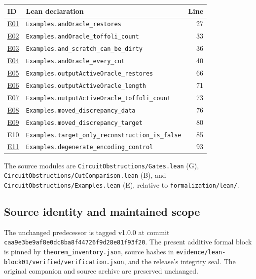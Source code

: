 \documentclass[11pt,letterpaper]{article}
\newcommand{\pathref}[1]{{\small\nolinkurl{#1}}}
\begin{document}
\begin{longtable}{@{}p{.39in}p{4.52in}r@{}}
\toprule ID & Lean declaration & Line\\\midrule\endhead
\bottomrule\endfoot
\hyperlink{E01}{E01} & {\fontsize{8.9}{10.8}\selectfont\nolinkurl{Examples.andOracle_restores}} & 27\\
\hyperlink{E02}{E02} & {\fontsize{8.9}{10.8}\selectfont\nolinkurl{Examples.andOracle_toffoli_count}} & 33\\
\hyperlink{E03}{E03} & {\fontsize{8.9}{10.8}\selectfont\nolinkurl{Examples.and_scratch_can_be_dirty}} & 36\\
\hyperlink{E04}{E04} & {\fontsize{8.9}{10.8}\selectfont\nolinkurl{Examples.andOracle_every_cut}} & 40\\
\hyperlink{E05}{E05} & {\fontsize{8.9}{10.8}\selectfont\nolinkurl{Examples.outputActiveOracle_restores}} & 66\\
\hyperlink{E06}{E06} & {\fontsize{8.9}{10.8}\selectfont\nolinkurl{Examples.outputActiveOracle_length}} & 71\\
\hyperlink{E07}{E07} & {\fontsize{8.9}{10.8}\selectfont\nolinkurl{Examples.outputActiveOracle_toffoli_count}} & 73\\
\hyperlink{E08}{E08} & {\fontsize{8.9}{10.8}\selectfont\nolinkurl{Examples.moved_discrepancy_data}} & 76\\
\hyperlink{E09}{E09} & {\fontsize{8.9}{10.8}\selectfont\nolinkurl{Examples.moved_discrepancy_target}} & 80\\
\hyperlink{E10}{E10} & {\fontsize{8.9}{10.8}\selectfont\nolinkurl{Examples.target_only_reconstruction_is_false}} & 85\\
\hyperlink{E11}{E11} & {\fontsize{8.9}{10.8}\selectfont\nolinkurl{Examples.degenerate_encoding_control}} & 93\\
\end{longtable}
The source modules are \pathref{CircuitObstructions/Gates.lean} (G), \pathref{CircuitObstructions/CutComparison.lean} (B), and \pathref{CircuitObstructions/Examples.lean} (E), relative to \pathref{formalization/lean/}.

\subsection*{Source identity and maintained scope}
The unchanged predecessor is tagged v1.0.0 at commit
\pathref{caa9e3be9af8e0dc8ba8f44726f9d28e81f93f20}.
The present additive formal block is pinned by \pathref{theorem_inventory.json}, source hashes in \pathref{evidence/lean-block01/verified/verification.json}, and the release's integrity seal. The original companion and source archive are preserved unchanged.
\end{document}
